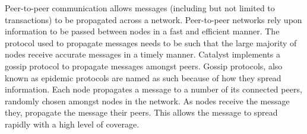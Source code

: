 Peer-to-peer communication allows messages (including but not limited to transactions) to be propagated across a network. Peer-to-peer networks rely upon information to be passed between nodes in a fast and efficient manner. The protocol used to propagate messages needs to be such that the large majority of nodes receive accurate messages in a timely manner. Catalyst implements a gossip protocol to propagate messages amongst peers. Gossip protocols, also known as epidemic protocols are named as such because of how they spread information. Each node propagates a message to a number of its connected peers, randomly chosen amongst nodes in the network. As nodes receive the message they, propagate the message their peers. This allows the message to spread rapidly with a high level of coverage. 

